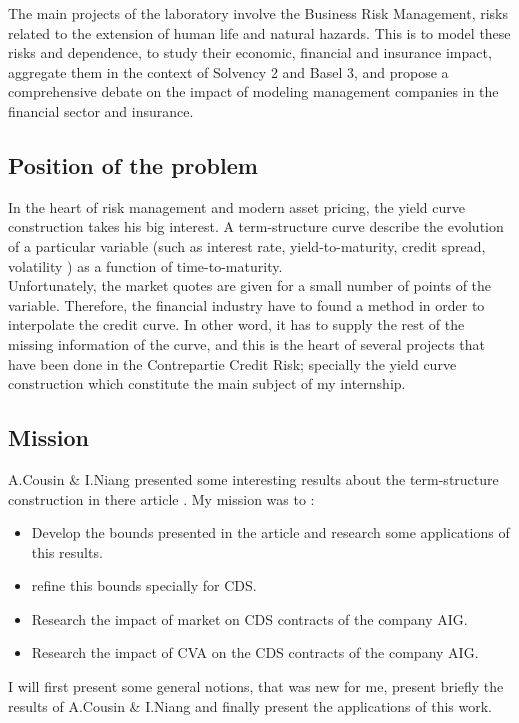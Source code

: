 The main projects of the laboratory involve the Business
Risk  Management, risks  related  to the  extension of  human  life and  natural
hazards. This is  to model these risks and dependence,  to study their economic,
financial and insurance impact, aggregate them  in the context of Solvency 2 and
Basel 3, and propose a comprehensive debate on the impact of modeling management
companies in the financial sector and insurance.\\




\subsection{Position of the problem}
\label{sec:position-problem}
\quad In the heart of risk management and modern asset pricing, the yield curve
construction  takes  his  big  interest. A  term-structure  curve  describe  the
evolution of  a particular  variable (such  as interest  rate, yield-to-maturity,
credit spread, volatility ) as a function of time-to-maturity.\\
 
Unfortunately, the market quotes  are given for a small number  of points of the
variable. Therefore, the  financial industry have to found a  method in order to
interpolate the credit  curve. In other word,  it has to supply the  rest of the
missing information of the curve, and this is the heart of several projects that
have been done in the Contrepartie Credit Risk; specially the yield curve
construction which constitute the main subject of my internship.\\

\subsection{Mission}
\label{sec:mission}
A.Cousin \& I.Niang presented some  interesting results about the term-structure
construction in there article \cite{OTRATS}.  My mission was to :
\begin{itemize}
\item Develop  the bounds  presented in the  article \cite{OTRATS}  and research
  some applications of this results.
\item refine this bounds specially for CDS.
\item Research the impact of market on CDS contracts of the company AIG.
\item Research the impact of CVA on the CDS contracts of the company AIG.
\end{itemize}

I will first present some general notions,  that was new for me, present briefly
the results of A.Cousin \& I.Niang and finally present the applications of this work.